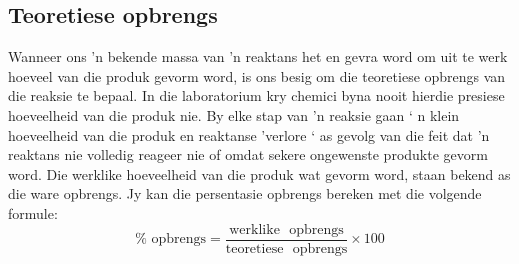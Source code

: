 \subsection*{Teoretiese opbrengs}
Wanneer ons 'n bekende massa van 'n reaktans het en gevra word om uit te werk hoeveel van die produk gevorm word, is ons besig om die teoretiese opbrengs van die reaksie te bepaal. In die laboratorium kry chemici byna nooit hierdie presiese hoeveelheid van die produk nie. By elke stap van 'n reaksie gaan ‘ n klein hoeveelheid van die produk en reaktanse 'verlore ‘ as gevolg van die feit dat  'n reaktans nie volledig reageer nie of omdat sekere ongewenste produkte gevorm word. Die werklike hoeveelheid van die produk wat gevorm word, staan bekend as die ware opbrengs. Jy kan die persentasie opbrengs bereken met die volgende formule:
\begin{equation*}
 \text{\% ~opbrengs} = \frac{\text{werklike ~opbrengs}}{\text{teoretiese ~opbrengs}} \times 100
\end{equation*}

